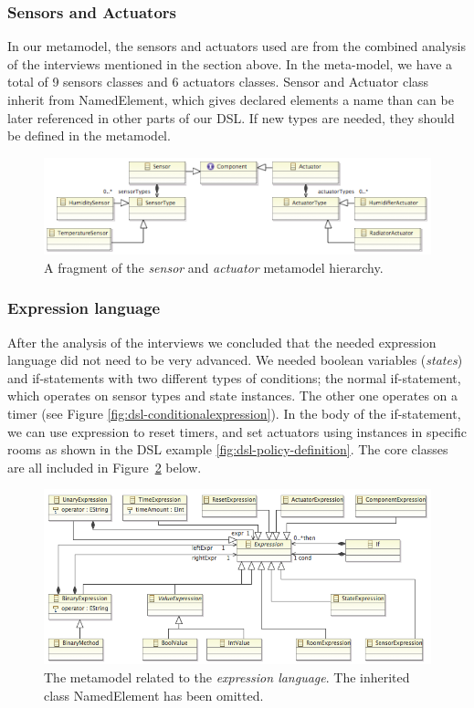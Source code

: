 \subsubsection{Sensors and Actuators}
In our metamodel, the sensors and actuators used are from the combined analysis of the interviews mentioned in the section above. In the meta-model, we have a total of 9 sensors classes and 6 actuators classes. Sensor and Actuator class inherit from NamedElement, which gives declared elements a name than can be later referenced in other parts of our DSL. If new types are needed, they should be defined in the metamodel.

\begin{figure}[h]
	\centering
    \includegraphics[scale=.7]{ecore-sensors-actuators.png} 
	\caption{A fragment of the \textit{sensor} and \textit{actuator} metamodel hierarchy.}
	\label{fig:ecore-sensors-actuators}
\end{figure}


\subsubsection{Expression language}
After the analysis of the interviews we concluded that the needed expression language did not need to be very advanced. We needed boolean variables (\textit{states}) and if-statements with two different types of conditions; the normal if-statement, which operates on sensor types and state instances. The other one operates on a timer (see Figure \ref{fig:dsl-conditionalexpression}). In the body of the if-statement, we can use expression to reset timers, and set actuators using instances in specific rooms as shown in the DSL example \ref{fig:dsl-policy-definition}. The core classes are all included in Figure \ref{fig:ecore-expression-language} below.

\begin{figure}[h]
  \centering
    \includegraphics[scale=.5]{ecore-expression-language.png} 
	\caption{The metamodel related to the \textit{expression language}. The inherited class NamedElement has been omitted.}
	\label{fig:ecore-expression-language}
\end{figure}


